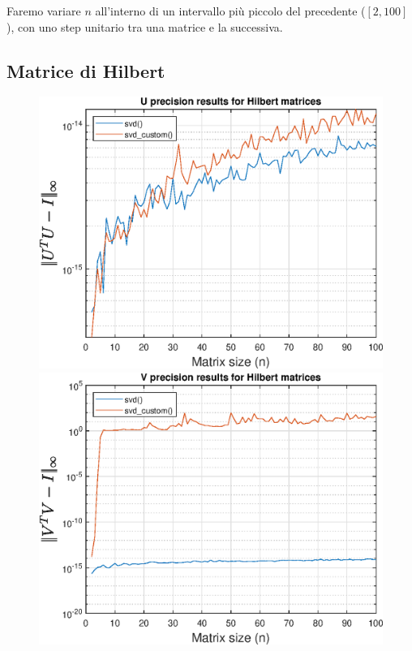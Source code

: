 Faremo variare $n$ all'interno di un intervallo più piccolo del precedente ($[2, 
100]$), con uno step unitario tra una matrice e la successiva.

\subsection{Matrice di Hilbert}

\begin{figure}[!htb]
\includegraphics[width=\linewidth]{imgs/04_-_U_precision_results_for_Hilbert_matrices.eps}
\endminipage\hfill
{}  
\includegraphics[width=\linewidth]{imgs/05_-_V_precision_results_for_Hilbert_matrices.eps}

\end{figure}

